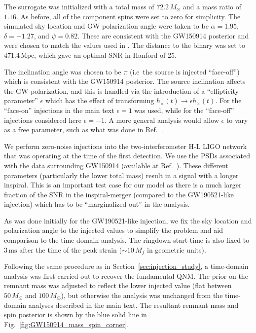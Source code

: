 The surrogate was initialized with a total mass of $72.2\,M_\odot$ and a mass ratio of $1.16$. 
As before, all of the component spins were set to zero for simplicity. 
The simulated sky location and GW polarization angle were taken to be $\alpha = 1.95$, $\delta = -1.27$, and $\psi = 0.82$. These are consistent with the GW150914 posterior and were chosen to match the values used in \cite{Isi:2019aib}.
The distance to the binary was set to $471.4\,\mathrm{Mpc}$, which gave an optimal SNR in Hanford of 25.

The inclination angle was chosen to be $\pi$ (i.e\ the source is injected ``face-off'') which is consistent with the GW150914 posterior.
The source inclination affects the GW polarization, and this is handled via the introduction of a ``ellipticity parameter'' $\epsilon$ which has the effect of transforming $h_\times(t) \rightarrow \epsilon h_\times(t)$.
For the ``face-on'' injections in the main text $\epsilon=1$ was used, while for the ``face-off'' injections considered here $\epsilon=-1$.
A more general analysis would allow $\epsilon$ to vary as a free parameter, such as what was done in Ref.~\cite{Isi:2021iql}.

We perform zero-noise injections into the two-interferometer H-L LIGO network that was operating at the time of the first detection. 
We use the PSDs associated with the data surrounding GW150914 (available at Ref.~\cite{gwtc1psds}).
These different parameters (particularly the lower total mass) result in a signal with a longer inspiral.
This is an important test case for our model as there is a much larger fraction of the SNR in the inspiral-merger (compared to the GW190521-like injection) which has to be ``marginalized out'' in the analysis.

As was done initially for the GW190521-like injection, we fix the sky location and polarization angle to the injected values to simplify the problem and aid comparison to the time-domain analysis.
The ringdown start time is also fixed to $3\,\mathrm{ms}$ after the time of the peak strain ($\sim 10\,M_f$ in geometric units).

Following the same procedure as in Section~\ref{sec:injection_study}, a time-domain analysis was first carried out to recover the fundamental QNM. 
The prior on the remnant mass was adjusted to reflect the lower injected value (flat between $50\,M_\odot$ and $100\,M_\odot$), but otherwise the analysis was unchanged from the time-domain analyses described in the main text.
The resultant remnant mass and spin posterior is shown by the blue solid line in Fig.~\ref{fig:GW150914_mass_spin_corner}.

